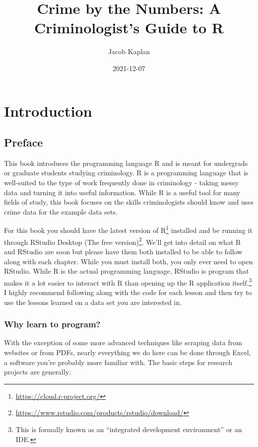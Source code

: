 \documentclass[
]{krantz}
\title{Crime by the Numbers: A Criminologist's Guide to R}
\author{Jacob Kaplan}
\date{2021-12-07}
\renewcommand{\href}[2]{#2\footnote{\url{#1}}}
\begin{document}
\maketitle

{
\hypersetup{linkcolor=}
\setcounter{tocdepth}{2}
\tableofcontents
}
\mainmatter

\hypertarget{part-introduction}{%
\part{Introduction}\label{part-introduction}}

\hypertarget{preface}{%
\chapter{Preface}\label{preface}}

This book introduces the programming language R and is meant for undergrads or graduate students studying criminology. R is a programming language that is well-suited to the type of work frequently done in criminology - taking messy data and turning it into useful information. While R is a useful tool for many fields of study, this book focuses on the skills criminologists should know and uses crime data for the example data sets.

For this book you should have the latest version of \href{https://cloud.r-project.org/}{R} installed and be running it through \href{https://www.rstudio.com/products/rstudio/download/}{RStudio Desktop (The free version)}. We'll get into detail on what R and RStudio are soon but please have them both installed to be able to follow along with each chapter. While you must install both, you only ever need to open RStudio. While R is the actual programming language, RStudio is program that makes it a lot easier to interact with R than opening up the R application itself.\footnote{This is formally known as an ``integrated development environment'' or an IDE.} I highly recommend following along with the code for each lesson and then try to use the lessons learned on a data set you are interested in.

\hypertarget{why-learn-to-program}{%
\section{Why learn to program?}\label{why-learn-to-program}}

With the exception of some more advanced techniques like scraping data from websites or from PDFs, nearly everything we do here can be done through Excel, a software you're probably more familiar with. The basic steps for research projects are generally:
\end{document}
